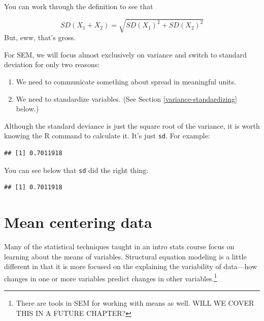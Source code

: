 \documentclass[
]{book}
\newenvironment{Shaded}{\begin{snugshade}}{\end{snugshade}}
\newcommand{\FunctionTok}[1]{\textcolor[rgb]{0.00,0.00,0.00}{#1}}
\newcommand{\NormalTok}[1]{#1}
\newcommand{\SpecialCharTok}[1]{\textcolor[rgb]{0.00,0.00,0.00}{#1}}
\providecommand{\tightlist}{%
  \setlength{\itemsep}{0pt}\setlength{\parskip}{0pt}}
\begin{document}
You can work through the definition to see that

\[
SD\left(X_{1} + X_{2}\right) = \sqrt{
SD\left(X_{1}\right)^{2} + SD\left(X_{2}\right)^{2}
}
\]
But, eww, that's gross.

For SEM, we will focus almost exclusively on variance and switch to standard deviation for only two reasons:

\begin{enumerate}
\def\labelenumi{\arabic{enumi}.}
\tightlist
\item
  We need to communicate something about spread in meaningful units.
\item
  We need to standardize variables. (See Section \ref{variance-standardizing} below.)
\end{enumerate}

Although the standard deviance is just the square root of the variance, it is worth knowing the R command to calculate it. It's just \texttt{sd}. For example:

\begin{Shaded}
\end{Shaded}

\begin{verbatim}
## [1] 0.7011918
\end{verbatim}

You can see below that \texttt{sd} did the right thing:

\begin{Shaded}
\end{Shaded}

\begin{verbatim}
## [1] 0.7011918
\end{verbatim}

\hypertarget{variance-mean-centering}{%
\section{Mean centering data}\label{variance-mean-centering}}

Many of the statistical techniques taught in an intro stats course focus on learning about the means of variables. Structural equation modeling is a little different in that it is more focused on the explaining the variability of data---how changes in one or more variables predict changes in other variables.\footnote{There are tools in SEM for working with means as well. WILL WE COVER THIS IN A FUTURE CHAPTER?}
\end{document}
